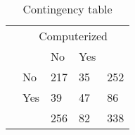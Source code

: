 \begin{table}
\begin{small}
\begin{threeparttable}
\caption{{\normalsize Contingency table}}
\label{table:contingency_classifications}
\begin{tabular}{ll|ll|l}
& \multicolumn{4}{c}{Computerized} \tabularnewline[0.1cm]
& & No & Yes &   \tabularnewline
\cline{2-5}
\parbox[t]{2mm}{} & No & 217 & 35 & 252 \tabularnewline
& Yes & 39 & 47 & 86 \tabularnewline
{}
&  & 256 & 82 & 338 \tabularnewline
\end{tabular}
\end{threeparttable}
\end{small}
\end{table}
